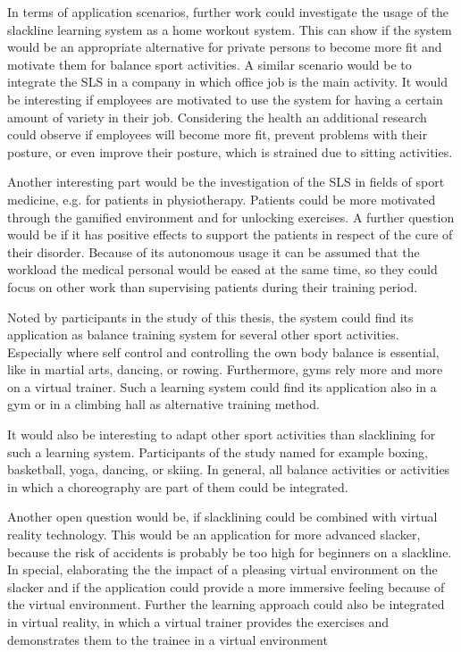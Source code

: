In terms of application scenarios, further work could investigate the usage of the slackline learning system as a home workout system.
This can show if the system would be an appropriate alternative for private persons to become more fit and motivate them for balance sport activities.
A similar scenario would be to integrate the SLS in a company in which office job is the main activity.
It would be interesting if employees are motivated to use the system for having a certain amount of variety in their job.
Considering the health an additional research could observe if employees will become more fit, prevent problems with their posture, or even improve their posture, which is strained due to sitting activities.

Another interesting part would be the investigation of the SLS in fields of sport medicine, e.g. for patients in physiotherapy.
Patients could be more motivated through the gamified environment and for unlocking exercises.
A further question would be if it has positive effects to support the patients in respect of the cure of their disorder.
Because of its autonomous usage it can be assumed that the workload the medical personal would be eased at the same time, so they could focus on other work than supervising patients during their training period.

Noted by participants in the study of this thesis, the system could find its application as balance training system for several other sport activities.
Especially where self control and controlling the own body balance is essential, like in martial arts, dancing, or rowing.
Furthermore, gyms rely more and more on a virtual trainer.
Such a learning system could find its application also in a gym or in a climbing hall as alternative training method.

It would also be interesting to adapt other sport activities than slacklining for such a learning system.
Participants of the study named for example boxing, basketball, yoga, dancing, or skiing.
In general, all balance activities or activities in which a choreography are part of them could be integrated.

Another open question would be, if slacklining could be combined with virtual reality technology.
This would be an application for more advanced slacker, because the risk of accidents is probably be too high for beginners on a slackline.
In special, elaborating the the impact of a pleasing virtual environment on the slacker and if the application could provide a more immersive feeling because of the virtual environment.
Further the learning approach could also be integrated in virtual reality, in which a virtual trainer provides the exercises and demonstrates them to the trainee in a virtual environment

% 


